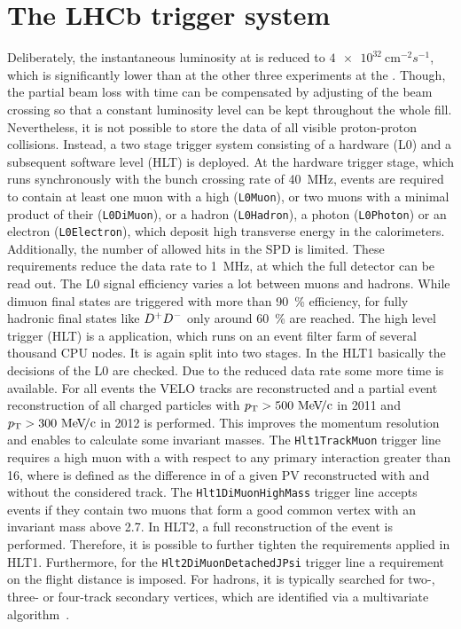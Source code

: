 
\section{The LHCb trigger system}
\label{sec:detector:trigger}

Deliberately, the instantaneous luminosity at \lhcb is reduced to
$\SI{4e32}{\cm^{-2}s^{-1}}$, which is significantly lower than at the other
three experiments at the \lhc. Though, the partial beam loss with time can be
compensated by adjusting of the beam crossing so that a constant luminosity
level can be kept throughout the whole fill. Nevertheless, it is not possible
to store the data of all visible proton-proton collisions. Instead, a two
stage trigger system consisting of a hardware (L0) and a subsequent software
level (HLT) is deployed. At the hardware trigger stage, which runs
synchronously with the bunch crossing rate of \SI{40}{\mega\hertz}, events are
required to contain at least one muon with a high \pt (\texttt{L0Muon}), or
two muons with a minimal product of their \pT (\texttt{L0DiMuon}), or a hadron
(\texttt{L0Hadron}), a photon (\texttt{L0Photon}) or an electron
(\texttt{L0Electron}), which deposit high transverse energy in the
calorimeters. Additionally, the number of allowed hits in the SPD is limited.
These requirements reduce the data rate to \SI{1}{\mega\hertz}, at which the
full detector can be read out. The L0 signal efficiency varies a lot between
muons and hadrons. While dimuon final states are triggered with more than
\SI{90}{\percent} efficiency, for fully hadronic final states like ${{D}^+}{{D}^-}$
only around \SI{60}{\percent} are reached. The high level trigger (HLT) is a
\cpp application, which runs on an event filter farm of several thousand CPU
nodes. It is again split into two stages. In the HLT1 basically the decisions
of the L0 are checked. Due to the reduced data rate some more time is
available. For all events the VELO tracks are reconstructed and a partial
event reconstruction of all charged particles with $\mbox{$p_{\mathrm{ T}}$} > \SI{500}{\ensuremath{{\mathrm{\,Me\kern -0.1em V\!/}c}}}$ in
2011 and $\mbox{$p_{\mathrm{ T}}$} > \SI{300}{\ensuremath{{\mathrm{\,Me\kern -0.1em V\!/}c}}}$ in 2012 is performed. This improves the
momentum resolution and enables to calculate some invariant masses. The
\texttt{Hlt1TrackMuon} trigger line requires a high \pt muon with a \chisqip
with respect to any primary interaction greater than 16, where \chisqip is
defined as the difference in \chisq of a given PV reconstructed with and
without the considered track. %
The \texttt{Hlt1DiMuonHighMass} trigger line accepts events if they contain
two muons that form a good common vertex with an invariant mass above
\SI{2.7}{\gevcc}. In HLT2, a full reconstruction of the event is performed.
Therefore, it is possible to further tighten the requirements applied in HLT1.
Furthermore, for the \texttt{Hlt2DiMuonDetachedJPsi} trigger line a
requirement on the flight distance is imposed. For hadrons, it is typically
searched for two-, three- or four-track secondary vertices, which are
identified via a multivariate algorithm~\cite{BBDT}.

